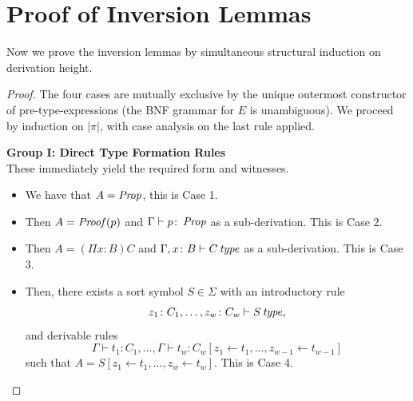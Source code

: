 \chapter{Proof of Inversion Lemmas} \label{app:inversion-lemmas}

Now we prove the inversion lemmas by simultaneous structural induction on derivation height.
\trulecases*
\begin{proof}
    The four cases are mutually exclusive by the unique outermost constructor of pre-type-expressions 
    (the BNF grammar for $E$ is unambiguous). We proceed by induction on $|\pi|$, with case analysis on 
    the last rule applied.
    
    \newpage
    \noindent
    \textbf{Group I: Direct Type Formation Rules} \\
    These immediately yield the required form and witnesses.
    \begin{itemize}
        \item[\ref{rule:prop}] We have that $A = \operatorname{\mathit{Prop}}$, this is Case 1.
        
        \item[\ref{rule:prop-type}] Then $A = \operatorname{\mathit{Proof}}(p)$ and $\Gamma \vdash p \colon \operatorname{\mathit{Prop}}$ as a sub-derivation. This is Case 2.
        \item[\ref{rule:prod-form}] Then $A = (\Pi x \colon B)C$ and $\Gamma, x \colon B \vdash C \operatorname{\mathit{\space type}}$ as a sub-derivation. This is Case 3.
        \item[\textsc{Introductory Rule}] Then, there exists a sort symbol $S \in \Sigma$ with an introductory rule $$z_1 \colon C_1, \dots, z_w \colon C_w \vdash S \operatorname{\mathit{\space type}},$$ and derivable rules 
            $$\Gamma \vdash t_1 \colon C_1, \dots, \Gamma \vdash t_w \colon C_w[z_1 \leftarrow t_1, \dots, z_{w-1} \leftarrow t_{w-1}]$$ 
            such that $A = S[z_1 \leftarrow t_1, \dots, z_w \leftarrow t_w]$.
            This is Case 4.
    \end{itemize}


\end{proof}
